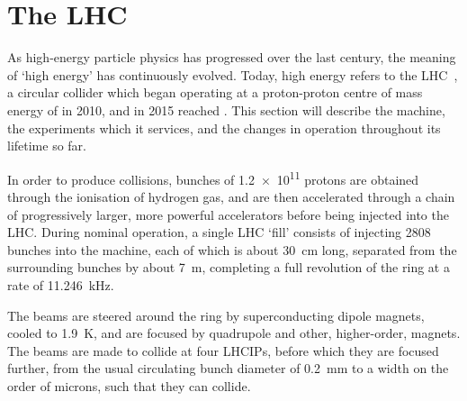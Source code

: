 \chapter{The \acl{LHC}}
\label{chap:intro:lhc}

As high-energy particle physics has progressed over the last century, the 
meaning of `high energy' has continuously evolved.
Today, high energy refers to the \acl{LHC}~\cite{Bruning:2004ej}, a circular 
collider which began operating at a proton-proton centre of mass energy of 
 in 2010, and in 2015 reached .
This section will describe the machine, the experiments which it services, and 
the changes in operation throughout its lifetime so far.

In order to produce collisions, bunches of \num{1.2e11} protons are obtained 
through the ionisation of hydrogen gas, and are then accelerated through a 
chain of progressively larger, more powerful accelerators before being injected 
into the \ac{LHC}.
During nominal operation, a single \ac{LHC} `fill' consists of injecting 2808 
bunches into the machine, each of which is about \SI{30}{\centi\metre} long, 
separated from the surrounding bunches by about \SI{7}{\metre}, completing a 
full revolution of the ring at a rate of \SI{11.246}{\kilo\hertz}.

The beams are steered around the ring by superconducting dipole magnets, cooled 
to \SI{1.9}{\kelvin}, and are focused by quadrupole and other, higher-order, 
magnets.
The beams are made to collide at four \acp{LHCIP}, before which they are 
focused further, from the usual circulating bunch diameter of 
\SI{0.2}{\milli\metre} to a width on the order of microns, such that they can 
collide.

